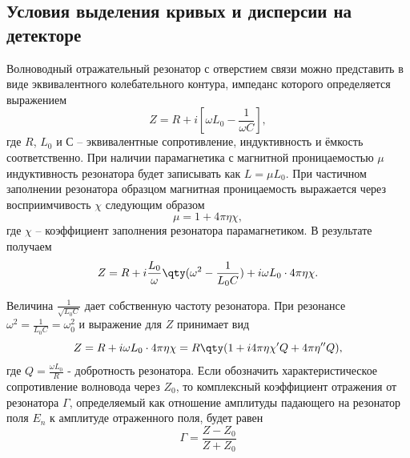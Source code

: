 \subsection{Условия выделения кривых и дисперсии на детекторе}%


Волноводный отражательный резонатор с отверстием связи можно представить в виде эквивалентного колебательного контура, импеданс которого определяется выражением
\begin{equation}
    \label{eq:1}
    Z = R + i [ \omega L_{0} - \frac{1}{\omega C}],
\end{equation}
где $R$, $L_{0}$ и $С$ -- эквивалентные сопротивление, индуктивность и ёмкость соответственно. При наличии парамагнетика с магнитной проницаемостью  $\mu$ индуктивность резонатора будет записывать как $L = \mu L_{0}$. При частичном заполнении резонатора образцом магнитная проницаемость выражается через восприимчивость $\chi$ следующим образом
\begin{equation}
    \label{eq:2}
    \mu = 1 + 4 \pi \eta \chi,
\end{equation}
где $\chi$ -- коэффициент заполнения резонатора парамагнетиком. В результате получаем
\begin{equation}
    \label{eq:3}
    Z = R + i \frac{L_{0}}{\omega} \qty( \omega^{2} - \frac{1}{L_{0}C}) + i \omega L_{0} \cdot 4 \pi \eta \chi.
\end{equation} 

Величина $\frac{1}{\sqrt{L_{0} C}}$ дает собственную частоту резонатора. При резонансе $\omega^2 = \frac{1}{L_{0}C} = \omega^2_0$ и выражение для $Z$ принимает вид
\begin{equation}
    \label{eq:4}
    Z = R + i \omega L_{0} \cdot 4 \pi \eta \chi = R \qty( 1 + i 4 \pi \eta \chi' Q + 4 \pi \eta'' Q),
\end{equation}
где $Q = \frac{\omega L_0}{R}$ - добротность резонатора. Если обозначить характеристическое сопротивление волновода через $Z_0$, то комплексный коэффициент отражения от резонатора  $\Gamma$, определяемый как отношение амплитуды падающего на резонатор поля  $E_n$ к амплитуде отраженного поля, будет равен
 \begin{equation}
    \label{eq:5}
    \Gamma = \frac{Z-Z_{0}}{Z+Z_{0}}
\end{equation}

